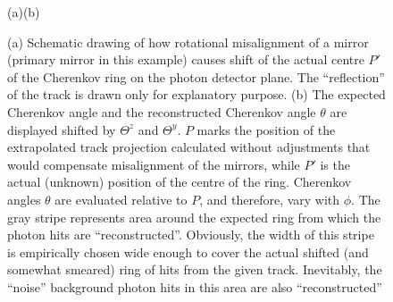 \begin{figure}[hbt]
  \vspace{-0.5\baselineskip}
  \hspace{0.35\textwidth}(a)\hspace{0.52\textwidth}(b)\hspace{0.13\textwidth}
  \vspace{-0.5\baselineskip}
  \caption{
    (a) Schematic drawing of how rotational misalignment of a \rich mirror
    (primary mirror in this example) causes shift of the actual centre $P'$ of
    the Cherenkov ring on the photon detector plane. The ``reflection'' of the
    track is drawn only for explanatory purpose. (b) The expected Cherenkov
    angle \thetaC and the reconstructed Cherenkov angle $\theta$ are displayed
    shifted by $\varTheta^z$ and $\varTheta^y$. $P$ marks the position of the
    extrapolated track projection calculated without adjustments that would
    compensate misalignment of the mirrors, while $P'$ is the actual (unknown)
    position of the centre of the ring. Cherenkov angles $\theta$ are evaluated
    relative to $P$, and therefore, vary with $\phi$. The gray stripe represents
    area around the expected ring from which the photon hits are
    ``reconstructed''. Obviously, the width of this stripe is empirically chosen
    wide enough to cover the actual shifted (and somewhat smeared) ring of hits
    from the given track. Inevitably, the ``noise'' background photon hits in
    this area are also ``reconstructed''}
  \label{fig:RICH_MisalignmentDiagrams}
  \vspace{-0.5\baselineskip}
\end{figure}

